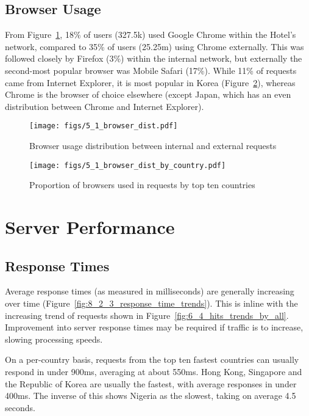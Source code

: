 \documentclass[12pt,titlepage]{article}
\begin{document}
\subsection{Browser Usage}

From Figure~\ref{fig:5_1_browser_dist}, 18\% of users (327.5k) used Google Chrome within the Hotel's network, compared to 35\% of users (25.25m) using Chrome externally. This was followed closely by Firefox (3\%) within the internal network, but externally the second-most popular browser was Mobile Safari (17\%). While 11\% of requests came from Internet Explorer, it is most popular in Korea (Figure~\ref{fig:5_1_browser_dist_by_country}), whereas Chrome is the browser of choice elsewhere (except Japan, which has an even distribution between Chrome and Internet Explorer).

\newpage

\begin{figure}[p]
  \hspace{-0.1\textwidth}
  \texttt{[image: figs/5\_1\_browser\_dist.pdf]}
  \caption{Browser usage distribution between internal and external requests}
  \label{fig:5_1_browser_dist}
\end{figure}

\begin{figure}[p]
  \centering
  \texttt{[image: figs/5\_1\_browser\_dist\_by\_country.pdf]}
  \caption{Proportion of browsers used in requests by top ten countries}
  \label{fig:5_1_browser_dist_by_country}
\end{figure}


\newpage
\clearpage
\section{Server Performance}

\subsection{Response Times}
\label{ssub:response_times}
Average response times (as measured in milliseconds) are generally increasing over time (Figure~\ref{fig:8_2_3_response_time_trends}). This is inline with the increasing trend of requests shown in Figure~\ref{fig:6_4_hits_trends_by_all}. Improvement into server response times may be required if traffic is to increase, slowing processing speeds.

On a per-country basis, requests from the top ten fastest countries can usually respond in under 900ms, averaging at about 550ms. Hong Kong, Singapore and the Republic of Korea are usually the fastest, with average responses in under 400ms. The inverse of this shows Nigeria as the slowest, taking on average 4.5 seconds. 
\end{document}

